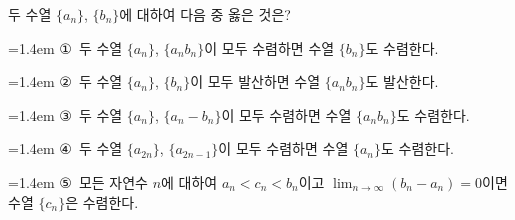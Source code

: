 두 수열 $\{a_n\}$, $\{b_n\}$에 대하여 다음 중 옳은 것은?
\par\medskip\par\noindent\hangindent=1.4em {\small ①}\ 두 수열 $\{a_n\}$, $\{a_nb_n\}$이 모두 수렴하면 수열 $\{b_n\}$도 수렴한다.\par\noindent\hangindent=1.4em {\small ②}\ 두 수열 $\{a_n\}$, $\{b_n\}$이 모두 발산하면 수열 $\{a_nb_n\}$도 발산한다.\par\noindent\hangindent=1.4em {\small ③}\ 두 수열 $\{a_n\}$, $\{a_n-b_n\}$이 모두 수렴하면 수열 $\{a_nb_n\}$도 수렴한다.\par\noindent\hangindent=1.4em {\small ④}\ 두 수열 $\{a_{2n}\}$, $\{a_{2n-1}\}$이 모두 수렴하면 수열 $\{a_n\}$도 수렴한다.\par\noindent\hangindent=1.4em {\small ⑤}\ 모든 자연수 $n$에 대하여 $a_n<c_n<b_n$이고 $\displaystyle\lim_{n\to\infty}(b_n-a_n)=0$이면 수열 $\{c_n\}$은 수렴한다.\par\medskip
